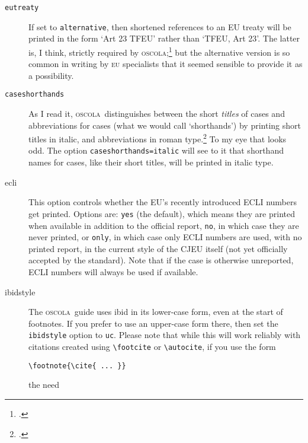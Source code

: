 \documentclass[a4paper,
               11pt,
	       DIV=1,			   
	       footinclude=false]
	      {scrartcl}
\newcommand{\oscolashort}{\textsc{oscola}\nocite{oscola}}
\begin{document}
\begin{description}
\item[\texttt{eutreaty}] If\label{options} set to
  \texttt{alternative}, then shortened references to an EU treaty will
  be printed in the form `Art 23 TFEU' rather than `TFEU, Art 23'. The
  latter is, I think, strictly required by
  \oscolashort;\footcite[29]{oscola} but the alternative version is so
  common in writing by \textsc{eu} specialists that it seemed sensible
  to provide it as a possibility.
\item[\texttt{caseshorthands}]
  As I read it, \oscolashort\ distinguishes between the short
  \emph{titles} of cases and abbreviations for cases (what we would
  call `shorthands') by printing short titles in italic, and
  abbreviations in roman type.\footcite[See `example 4'][15]{oscola}
  To my eye that looks odd. The option \texttt{caseshorthands=italic}
  will see to it that shorthand names for cases, like their short
  titles, will be printed in italic type.
\item[ecli]
   This option controls
  whether the EU's recently introduced ECLI numbers get
  printed. Options are: \verb|yes| (the default), which means they are
  printed when available in addition to the official report,
  \verb|no|, in which case they are never printed, or \verb|only|, in
  which case only ECLI numbers are used, with no printed report, in
  the current style of the CJEU itself (not yet officially accepted by
  the standard). Note that if the case is otherwise unreported, ECLI
  numbers will always be used if available.
\item[ibidstyle]
  The \oscolashort\ guide uses ibid in its lower-case form, even at
  the start of footnotes. If you prefer to use an upper-case form
  there, then set the \texttt{ibidstyle} option to \texttt{uc}. Please
  note that while this will work reliably with citations created using
  \verb|\footcite| or \verb|\autocite|, if you use the
  form\begin{verbatim}\footnote{\cite{ ... }}\end{verbatim}the need

\end{description}
\end{document}
